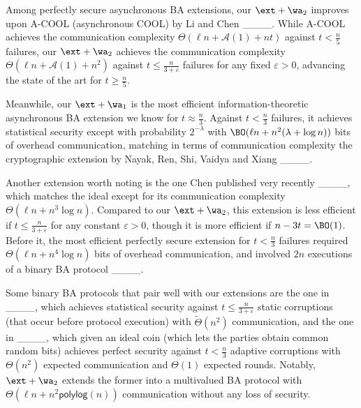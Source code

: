Among perfectly secure asynchronous BA extensions, our $\ext + \wa_2$ improves upon A-COOL (asynchronous COOL) by Li and Chen ____. While A-COOL achieves the communication complexity $\Theta(\ell n + \mathcal{A}(1) + nt)$ against $t < \frac{n}{5}$ failures, our $\ext + \wa_2$ achieves the communication complexity $\Theta(\ell n + \mathcal{A}(1) + n^2)$ against $t \leq \frac{n}{3 + \varepsilon}$ failures for any fixed $\varepsilon > 0$, advancing the state of the art \nolinebreak for \nolinebreak $t \geq \frac{n}{5}$. 

Meanwhile, our $\ext + \wa_1$ is the most efficient information-theoretic asynchronous BA extension we know for $t \approx \frac{n}{3}$. Against $t < \frac{n}{3}$ failures, it achieves statistical security except with probability $2^{-\lambda}$ with $\BO(\ell n + n^2(\lambda + \log n))$ bits of overhead communication, matching in terms of communication complexity the cryptographic extension by Nayak, Ren, Shi, Vaidya and Xiang ____.

Another extension worth noting is the one Chen published very recently ____, which matches the ideal except for its communication complexity $\Theta(\ell n + n^3\log n)$. Compared to our $\ext + \wa_2$, this extension is less efficient if $t \leq \frac{n}{3 + \varepsilon}$ for any constant $\varepsilon > 0$, though it is more efficient if $n - 3t = \BO(1)$. Before it, the most efficient perfectly secure extension for $t < \frac{n}{3}$ failures required $\Theta(\ell n + n^4\log n)$ bits of overhead communication, and involved $2n$ executions of a binary BA protocol ____.

Some binary BA protocols that pair well with our extensions are the one in ____, which achieves statistical security against $t \leq \frac{n}{3 + \varepsilon}$  static corruptions (that occur before protocol execution) with $\widetilde{\Theta}(n^2)$ communication, and the one in ____, which given an ideal coin (which lets the parties obtain common random bits) achieves perfect security against $t < \frac{n}{3}$ adaptive corruptions with $\Theta(n^2)$ expected communication and $\Theta(1)$ expected rounds. Notably, $\ext + \wa_2$ extends the former into a multivalued BA protocol with $\Theta(\ell n + n^2\mathsf{polylog}(n))$ communication without any loss of security.